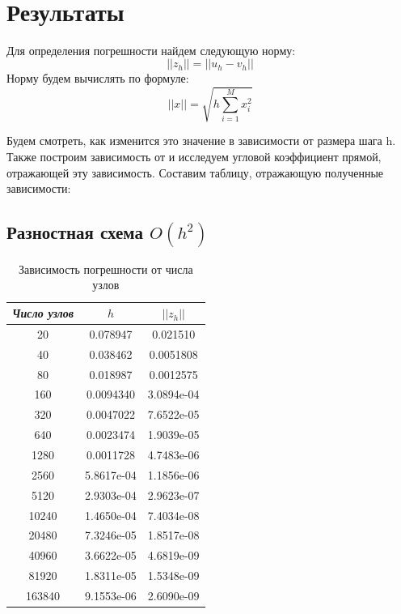 \documentclass[12pt]{article}
\begin{document}
\
\

\section{Результаты}
Для определения погрешности найдем следующую норму:
$$
||z_h|| = || u_h - v_h ||
$$
Норму будем вычислять по формуле:
$$
||x|| = \sqrt{h\sum\limits_{i=1}^M x_i^2}
$$

Будем смотреть, как изменится это значение в зависимости от размера шага h. Также построим зависимость  от  и исследуем угловой коэффициент прямой, отражающей эту зависимость. Составим таблицу, отражающую полученные зависимости:

\pagebreak

\subsection{Разностная схема $O(h^2)$}

\begin{table}[H]
\caption{Зависимость погрешности от числа узлов}
\begin{center}
\begin{tabular}{|c|c|c|}
\hline
\textit{Число узлов} &$ h$ & $||z_h||$  \\
\hline
20 & 0.078947 & 0.021510 \\
\hline
40 & 0.038462 & 0.0051808 \\
\hline
80 & 0.018987 & 0.0012575 \\
\hline
160 & 0.0094340 & 3.0894e-04 \\
\hline
320 & 0.0047022 & 7.6522e-05 \\
\hline
640 & 0.0023474 & 1.9039e-05 \\
\hline
1280 & 0.0011728 & 4.7483e-06 \\
\hline
2560 & 5.8617e-04 & 1.1856e-06 \\
\hline
5120 & 2.9303e-04 & 2.9623e-07 \\
\hline
10240 & 1.4650e-04 & 7.4034e-08 \\
\hline
20480 & 7.3246e-05 & 1.8517e-08 \\
\hline
40960 & 3.6622e-05 & 4.6819e-09 \\
\hline
81920 & 1.8311e-05 & 1.5348e-09 \\
\hline
163840 & 9.1553e-06 & 2.6090e-09 \\
\hline

\end{tabular}
\end{center}
\end{table}
\end{document}
